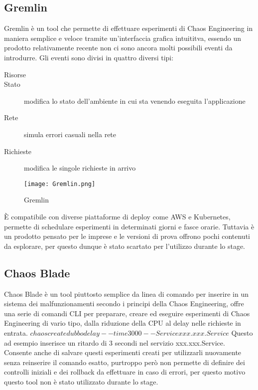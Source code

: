 \subsection{Gremlin}
Gremlin è un tool che permette di effettuare esperimenti di Chaos Engineering in maniera semplice e veloce tramite un'interfaccia grafica intuititva, essendo un prodotto relativamente recente non ci sono ancora molti possibili eventi da introdurre.
Gli eventi sono divisi in quattro diversi tipi:
\begin{description}
    \item[Risorse]
    \item[Stato] modifica lo stato dell'ambiente in cui sta venendo eseguita l'applicazione
    \item[Rete] simula errori casuali nella rete
    \item[Richieste] modifica le singole richieste in arrivo    
\end{description}
\begin{figure}[]
    \centering
    \texttt{[image: Gremlin.png]}
    \caption{Gremlin}
    \label{tab:gremlin}
\end{figure}
È compatibile con diverse piattaforme di deploy come AWS e Kubernetes, permette di schedulare esperimenti in determinati giorni e fasce orarie.
Tuttavia è un prodotto pensato per le imprese e le versioni di prova offrono pochi contenuti da esplorare, per questo dunque è stato scartato per l'utilizzo durante lo stage.

\subsection{Chaos Blade}
Chaos Blade è un tool piuttosto semplice da linea di comando per inserire in un sistema dei malfunzionamenti secondo i principi della Chaos Engineering, offre una serie di comandi CLI per preparare, creare ed eseguire esperimenti di Chaos Engineering di vario tipo, dalla riduzione della CPU al delay nelle richieste in entrata.
\begin{math}
    chaos create dubbo delay --time 3000 --Service xxx.xxx.Service
\end{math}
Questo ad esempio inserisce un ritardo di 3 secondi nel servizio xxx.xxx.Service.
Consente anche di salvare questi esperimenti creati per utilizzarli nuovamente senza reinserire il comando esatto, purtroppo però non permette di definire dei controlli iniziali e dei rollback da effettuare in caso di errori, per questo motivo questo tool non è stato utilizzato durante lo stage.

